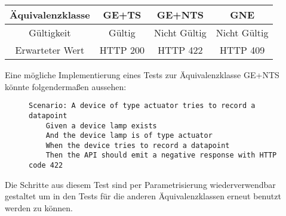 \begin{center}
    \begin{tabular}{|c||c|c|c|}
        \hline
        Äquivalenzklasse&GE+TS&GE+NTS&GNE\\
        \hline
        Gültigkeit&Gültig&Nicht Gültig&Nicht Gültig\\
        \hline
        Erwarteter Wert&HTTP 200&HTTP 422&HTTP 409\\
        \hline
    \end{tabular}
\end{center}

Eine mögliche Implementierung eines Tests zur Äquivalenzklasse GE+NTS könnte folgendermaßen aussehen:

\begin{figure}[H]
    \begin{verbatim}
Scenario: A device of type actuator tries to record a datapoint
    Given a device lamp exists
    And the device lamp is of type actuator
    When the device tries to record a datapoint
    Then the API should emit a negative response with HTTP code 422
    \end{verbatim}
\end{figure}

Die Schritte aus diesem Test sind per Parametrisierung wiederverwendbar gestaltet um in den Tests für die anderen Äquivalenzklassen erneut benutzt werden zu können.